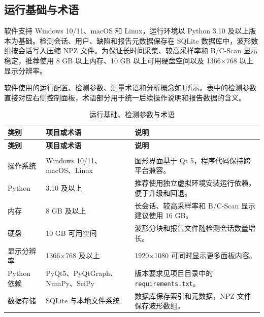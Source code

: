 \subsection{运行基础与术语}
\par
软件支持 Windows 10/11、macOS 和 Linux，运行环境以 Python 3.10 及以上版本为基础。检测会话、用户、缺陷和报告元数据保存在 SQLite 数据库中，波形数组按会话写入压缩 NPZ 文件。为保证长时间采集、较高采样率和 B/C-Scan 显示稳定，推荐使用 8 GB 以上内存、10 GB 以上可用硬盘空间以及 1366$\times$768 以上显示分辨率。
\par
软件使用的运行配置、检测参数、测量术语和分析概念如\cref{tab:runtime_terms}所示。表中的检测参数直接对应右侧控制面板，术语部分用于统一后续操作说明和报告数据的含义。

\begin{longtable}{p{}p{}p{}}
	\caption{运行基础、检测参数与术语}
	\label{tab:runtime_terms}\\
	\toprule
	\textbf{类别} & \textbf{项目或术语} & \textbf{说明} \\
	\midrule
	\endfirsthead

	\toprule
	\textbf{类别} & \textbf{项目或术语} & \textbf{说明} \\
	\midrule
	\endhead

	\bottomrule
	\endlastfoot

	\multicolumn{3}{l}{\textbf{运行环境}} \\
	\midrule
	操作系统 & Windows 10/11、macOS、Linux & 图形界面基于 Qt 5，程序代码保持跨平台兼容。 \\
	Python & 3.10 及以上 & 推荐使用独立虚拟环境安装运行依赖，便于升级和回退。 \\
	内存 & 8 GB 及以上 & 长会话、较高采样率和 B/C-Scan 显示建议使用 16 GB。 \\
	硬盘 & 10 GB 可用空间 & 波形分块和报告文件随检测会话数量增长。 \\
	显示分辨率 & 1366$\times$768 及以上 & 1920$\times$1080 可同时显示更多面板内容。 \\
	Python 依赖 & PyQt5、PyQtGraph、NumPy、SciPy & 版本要求见项目目录中的 \texttt{requirements.txt}。 \\
	数据存储 & SQLite 与本地文件系统 & 数据库保存索引和元数据，NPZ 文件保存波形数组。 \\
	\midrule


\end{longtable}
